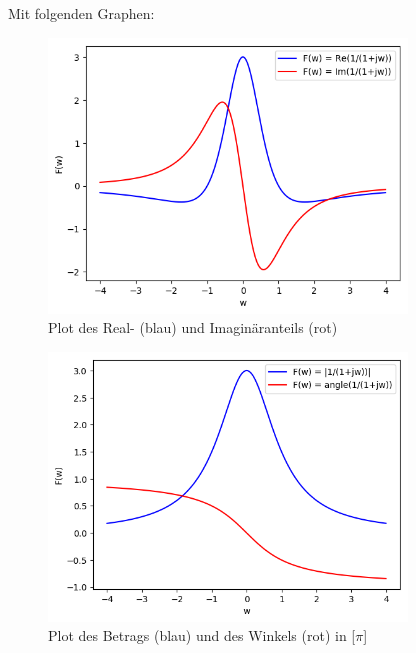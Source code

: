		Mit folgenden Graphen:\\
		\begin{figure}[h]
			\centering
			\caption{Plot des Real- (blau) und Imaginäranteils (rot)}
			\includegraphics[width = 0.85\textwidth]{A29_plot-real-imag.png}
		\end{figure}
		\begin{figure}[h]
			\centering
			\caption{Plot des Betrags (blau) und des Winkels (rot) in [$\pi$]}
			\includegraphics[width= 0.85\textwidth]{A29_plot-abs-angle.png}
		\end{figure}
